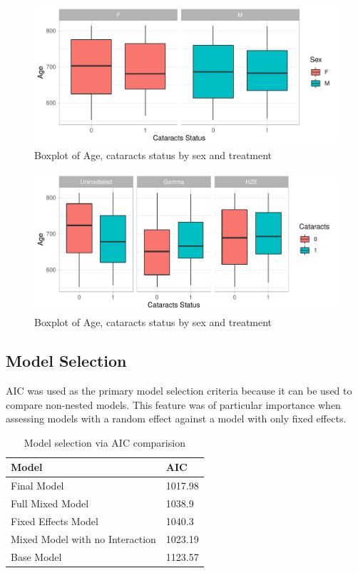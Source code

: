 \documentclass[12pt]{article}
\begin{document}
\begin{figure}[H]

{\centering \includegraphics[width=0.5\linewidth]{bookdown_report_files/figure-latex/scage-1} 

}

\caption{Boxplot of Age, cataracts status by sex and treatment}\label{fig:scage-1}
\end{figure}
\begin{figure}[H]

{\centering \includegraphics[width=0.5\linewidth]{bookdown_report_files/figure-latex/scage-2} 

}

\caption{Boxplot of Age, cataracts status by sex and treatment}\label{fig:scage-2}
\end{figure}

\hypertarget{model-selection}{%
\subsection{Model Selection}\label{model-selection}}

\label{sec:glmms}

AIC was used as the primary model selection criteria because it can be used to compare non-nested models. This feature was of particular importance when assessing models with a random effect against a model with only fixed effects.

\begin{table}[!h]
\centering
\begin{tabular}{ll}
  \toprule
Model & AIC \\ 
  \midrule
Final Model & 1017.98 \\ 
  Full Mixed Model & 1038.9 \\ 
  Fixed Effects Model & 1040.3 \\ 
  Mixed Model with no Interaction & 1023.19 \\ 
  Base Model & 1123.57 \\ 
   \bottomrule
\end{tabular}
\caption{Model selection via AIC comparision} 
\end{table}
\end{document}
